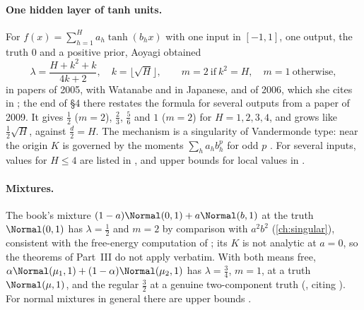 \begin{refsection}
\paragraph{One hidden layer of tanh units.} For $f(x)=\sum_{h=1}^Ha_h\tanh(b_hx)$ with one input in $[-1,1]$, one output, the truth $0$ and a positive prior, Aoyagi obtained
\[
\lambda=\frac{H+k^2+k}{4k+2},\quad k=\lfloor\sqrt H\rfloor,\qquad m=2\ \text{if}\ k^2=H,\quad m=1\ \text{otherwise},
\]
in papers of 2005, with Watanabe and in Japanese, and of 2006, which she cites in \textcite{Aoyagi2019}; the end of \S4 there restates the formula for several outputs from a paper of 2009. It gives $\frac12$ ($m=2$), $\frac23$, $\frac56$ and $1$ ($m=2$) for $H=1,2,3,4$, and grows like $\frac12\sqrt H$, against $\frac d2=H$. The mechanism is a singularity of Vandermonde type: near the origin $K$ is governed by the moments $\sum_ha_hb_h^p$ for odd $p$ \parencite{Aoyagi2010a,AoyagiNagata2012}. For several inputs, values for $H\le4$ are listed in \textcite[Theorem~6]{Aoyagi2019}, and upper bounds for local values in \textcite{Kurumadani2027}.

\paragraph{Mixtures.} The book's mixture $(1-a)\Normal(0,1)+a\Normal(b,1)$ at the truth $\Normal(0,1)$ has $\lambda=\frac12$ and $m=2$ by comparison with $a^2b^2$ (\cref{ch:singular}), consistent with the free-energy computation of \textcite{KariyaWatanabe2022}; its $K$ is not analytic at $a=0$, so the theorems of Part~III do not apply verbatim. With both means free, $\alpha\Normal(\mu_1,1)+(1-\alpha)\Normal(\mu_2,1)$ has $\lambda=\frac34$, $m=1$, at a truth $\Normal(\mu,1)$, and the regular $\frac32$ at a genuine two-component truth (\textcite[Example~2.1]{DrtonPlummer2017}, citing \textcite{Aoyagi2010a}). For normal mixtures in general there are upper bounds \parencite{YamazakiWatanabe2003}.


\end{refsection}
